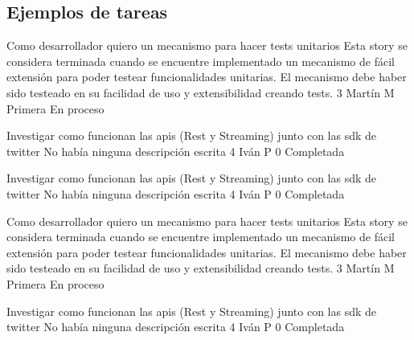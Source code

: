 



\newpage

\subsection{Ejemplos de tareas}

			{Como desarrollador quiero un mecanismo para hacer tests unitarios} %
			{Esta story se considera terminada cuando se encuentre implementado un mecanismo de fácil extensión para poder testear funcionalidades unitarias. } %
			{El mecanismo debe haber sido testeado en su facilidad de uso y extensibilidad creando tests.} %
			{3} %
			{Martín M} %
			{Primera} %
			{En proceso} %

		{Investigar como funcionan las apis (Rest y Streaming) junto con las sdk de twitter} %
		{No había ninguna descripción escrita} %
		{4} %
		{Iván P} %
		{0} %
		{Completada} %

		{Investigar como funcionan las apis (Rest y Streaming) junto con las sdk de twitter} %
		{No había ninguna descripción escrita} %
		{4} %
		{Iván P} %
		{0} %
		{Completada} %

\vspace{20pt}

			{Como desarrollador quiero un mecanismo para hacer tests unitarios} %
			{Esta story se considera terminada cuando se encuentre implementado un mecanismo de fácil extensión para poder testear funcionalidades unitarias. } %
			{El mecanismo debe haber sido testeado en su facilidad de uso y extensibilidad creando tests.} %
			{3} %
			{Martín M} %
			{Primera} %
			{En proceso} %

		{Investigar como funcionan las apis (Rest y Streaming) junto con las sdk de twitter} %
		{No había ninguna descripción escrita} %
		{4} %
		{Iván P} %
		{0} %
		{Completada} %
